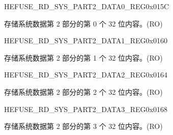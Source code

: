 \begin{register}{H}{EFUSE\_RD\_SYS\_PART2\_DATA0\_REG}{0x015C}\label{regdesc:EFUSERDSYSPART2DATA0REG}
%
\regnewline%
\begin{regdesc}\begin{reglist}
\label{fielddesc:EFUSESYSDATAPART20}\item [EFUSE\_SYS\_DATA\_PART2\_0] 存储系统数据第 2 部分的第 0 个 32 位内容。(RO)
\end{reglist}\end{regdesc}
\end{register}


\begin{register}{H}{EFUSE\_RD\_SYS\_PART2\_DATA1\_REG}{0x0160}\label{regdesc:EFUSERDSYSPART2DATA1REG}
%
\regnewline%
\begin{regdesc}\begin{reglist}
\label{fielddesc:EFUSESYSDATAPART21}\item [EFUSE\_SYS\_DATA\_PART2\_1] 存储系统数据第 2 部分的第 1 个 32 位内容。(RO)
\end{reglist}\end{regdesc}
\end{register}


\begin{register}{H}{EFUSE\_RD\_SYS\_PART2\_DATA2\_REG}{0x0164}\label{regdesc:EFUSERDSYSPART2DATA2REG}
%
\regnewline%
\begin{regdesc}\begin{reglist}
\label{fielddesc:EFUSESYSDATAPART22}\item [EFUSE\_SYS\_DATA\_PART2\_2] 存储系统数据第 2 部分的第 2 个 32 位内容。(RO)
\end{reglist}\end{regdesc}
\end{register}


\begin{register}{H}{EFUSE\_RD\_SYS\_PART2\_DATA3\_REG}{0x0168}\label{regdesc:EFUSERDSYSPART2DATA3REG}
%
\regnewline%
\begin{regdesc}\begin{reglist}
\label{fielddesc:EFUSESYSDATAPART23}\item [EFUSE\_SYS\_DATA\_PART2\_3] 存储系统数据第 2 部分的第 3 个 32 位内容。(RO)
\end{reglist}\end{regdesc}
\end{register}


